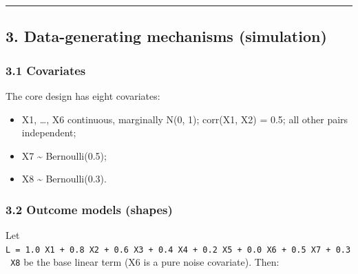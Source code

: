 \documentclass[
  10pt,
]{article}
\providecommand{\tightlist}{%
  \setlength{\itemsep}{0pt}\setlength{\parskip}{0pt}}
\begin{document}
\begin{center}\rule{0.5\linewidth}{0.5pt}\end{center}

\subsection{3. Data-generating mechanisms
(simulation)}\label{data-generating-mechanisms-simulation}

\subsubsection{3.1 Covariates}\label{covariates}

The core design has eight covariates:

\begin{itemize}
\tightlist
\item
  X1, \ldots, X6 continuous, marginally N(0, 1); corr(X1,
  X2) = 0.5; all other pairs independent;
\item
  X7 \textasciitilde{} Bernoulli(0.5);
\item
  X8 \textasciitilde{} Bernoulli(0.3).
\end{itemize}

\subsubsection{3.2 Outcome models
(shapes)}\label{outcome-models-shapes}

Let
\texttt{L\ =\ 1.0\ X1\ +\ 0.8\ X2\ +\ 0.6\ X3\ +\ 0.4\ X4\ +\ 0.2\ X5\ +\ 0.0\ X6\ +\ 0.5\ X7\ +\ 0.3\ X8}
be the base linear term (X6 is a pure noise covariate).
Then:
\end{document}
